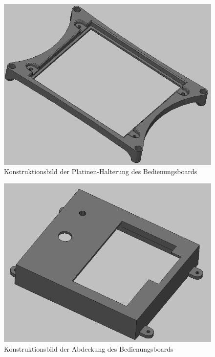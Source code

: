 \hspace{-3mm}
\begin{minipage}[t]{0.47\textwidth}
\vspace{-6mm}
\begin{figure}[H] %
\includegraphics[width=.85\textwidth]{sec2/images/3DAnbaukomponenten/Konstruktionsbilder/PlatinenHalterungKonstruktion} 
\centering
\captionsetup{width=.9\textwidth}	
\caption[Konstruktionsbild der Platinen-Halterung des Bedienungsboards]{Konstruktionsbild der Platinen-Halterung des Bedienungsboards}
\centering
\label{fig:PlatinenHalterungKonstruktion}
\end{figure}
\end{minipage}
\begin{minipage}[t]{0.47\textwidth}
\vspace{-6mm}
\begin{figure}[H] %
\includegraphics[width=.85\textwidth]{sec2/images/3DAnbaukomponenten/Konstruktionsbilder/DisplayAbdeckungKonstruktion} 
\centering
\captionsetup{width=.9\textwidth}
\caption[Konstruktionsbild der Abdeckung des Bedienungsboards]{Konstruktionsbild der Abdeckung des Bedienungsboards}
\centering
\label{fig:DisplayAbdeckungKonstruktion}
\end{figure}
\end{minipage}
\vspace{4mm}


